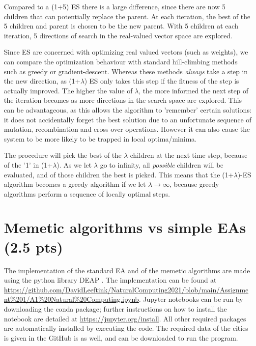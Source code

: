 \documentclass{article}
\begin{document}
Compared to a (1+5) ES there is a large difference, since there are now 5 children that can potentially replace the parent. At each iteration, the best of the 5 children and parent is chosen to be the new parent. With 5 children at each iteration, 5 directions of search in the real-valued vector space are explored.

Since ES are concerned with optimizing real valued vectors (such as weights), we can compare the optimization behaviour with standard hill-climbing methods such as greedy or gradient-descent. Whereas these methods \textit{always} take a step in the new direction, as (1+$\lambda$) ES only takes this step if the fitness of the step is actually improved. The higher the value of $\lambda$, the more informed the next step of the iteration becomes as more directions in the search space are explored. This can be advantageous, as this allows the algorithm to 'remember' certain solutions: it does not accidentally forget the best solution due to an unfortunate sequence of mutation, recombination and cross-over operations. However it can also cause the system to be more likely to be trapped in local optima/minima. 

The procedure will pick the best of the $\lambda$ children at the next time step, because of the '1' in (1+$\lambda$). As we let $\lambda$ go to infinity, all \textit{possible} children will be evaluated, and of those children the best is picked. This means that the (1+$\lambda$)-ES algorithm becomes a greedy algorithm if we let $\lambda \to \infty$, because greedy algorithms perform a sequence of locally optimal steps. 


\section{Memetic algorithms vs simple EAs (2.5 pts)}
The implementation of the standard EA and of the memetic algorithms are made using the python library DEAP \cite{deap}. The implementation can be found at \url{https://github.com/DavidLeeftink/NaturalComputing2021/blob/main/Assignment\%201/A1\%20Natural\%20Computing.ipynb}. Jupyter notebooks can be run by downloading the conda package; further instructions on how to install the notebook are detailed at \url{https://jupyter.org/install}. All other required packages are automatically installed by executing the code. The required data of the cities is given in the GitHub is as well, and can be downloaded to run the program. 
\end{document}

